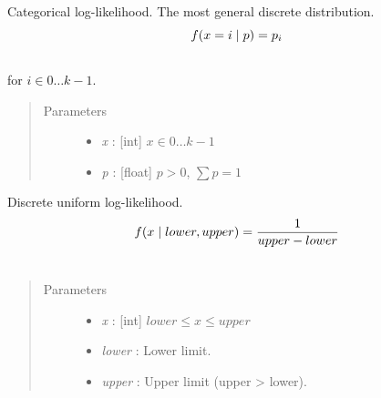 \documentclass[letterpaper,10pt,english]{sphinxmanual}
\begin{document}
\begin{fulllineitems}
\label{distributions:pymc.distributions.categorical_like}
Categorical log-likelihood. The most general discrete distribution.
\begin{gather}
\begin{split}f(x=i \mid p) = p_i\end{split}\notag\\\begin{split}\end{split}\notag
\end{gather}
for $i \in 0 \ldots k-1$.
\begin{quote}\begin{description}
\item[{Parameters }] \leavevmode\begin{itemize}
\item {} 
\emph{x} : {[}int{]} $x \in 0\ldots k-1$

\item {} 
\emph{p} : {[}float{]} $p > 0$, $\sum p = 1$

\end{itemize}

\end{description}\end{quote}

\end{fulllineitems}


\begin{fulllineitems}
\label{distributions:pymc.distributions.discrete_uniform_like}
Discrete uniform log-likelihood.
\begin{gather}
\begin{split}f(x \mid lower, upper) = \frac{1}{upper-lower}\end{split}\notag\\\begin{split}\end{split}\notag
\end{gather}\begin{quote}\begin{description}
\item[{Parameters }] \leavevmode\begin{itemize}
\item {} 
\emph{x} : {[}int{]} $lower \leq x \leq upper$

\item {} 
\emph{lower} : Lower limit.

\item {} 
\emph{upper} : Upper limit (upper \textgreater{} lower).

\end{itemize}

\end{description}\end{quote}

\end{fulllineitems}
\end{document}
